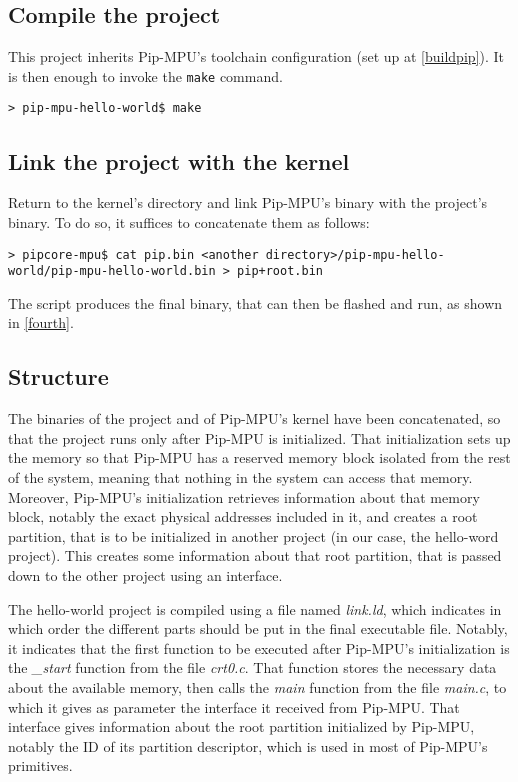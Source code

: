 \documentclass[10pt,a4paper,titlepage]{refart}
\begin{document}
\subsection{Compile the project}
This project inherits Pip-MPU's toolchain configuration (set up at \ref{buildpip}).
It is then enough to invoke the \texttt{make} command.

\begin{lstlisting}[style=BashStyle]
> pip-mpu-hello-world$ make
\end{lstlisting}

\subsection{Link the project with the kernel}
Return to the kernel's directory and link Pip-MPU's binary with the project's binary. To do so, it suffices to concatenate 
them as follows:

\begin{lstlisting}[style=BashStyle]
> pipcore-mpu$ cat pip.bin <another directory>/pip-mpu-hello-world/pip-mpu-hello-world.bin > pip+root.bin
\end{lstlisting}

The script produces the final binary, that can then be flashed and run, as shown in \cref{fourth}.

\subsection{Structure}\label{subsec:structure}
The binaries of the project and of Pip-MPU's kernel have been concatenated, so that the project runs only after Pip-MPU is 
initialized. That initialization sets up the memory so that Pip-MPU has a reserved memory block isolated from the rest of the system, 
meaning that nothing in the system can access that memory. Moreover, Pip-MPU's initialization retrieves information about that memory 
block, notably the exact physical addresses included in it, and creates a root partition, that is to be initialized in another project 
(in our case, the hello-word project). This creates some information about that root partition, that is passed down to the other 
project using an interface.

The hello-world project is compiled using a file named \textit{link.ld}, which indicates in which order the different parts should be 
put in the final executable file. Notably, it indicates that the first function to be executed after Pip-MPU's initialization is the 
\textit{\_start} function from the file \textit{crt0.c}. That function stores the necessary data about the available memory, then calls 
the \textit{main} function from the file \textit{main.c}, to which it gives as parameter the interface it received from Pip-MPU. That 
interface gives information about the root partition initialized by Pip-MPU, notably the ID of its partition descriptor, which is used 
in most of Pip-MPU's primitives. %
\end{document}
